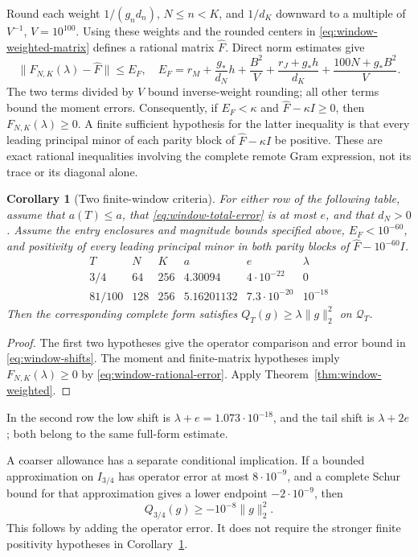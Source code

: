 \documentclass[11pt]{article}
\newtheorem{corollary}[theorem]{Corollary}
\theoremstyle{definition}
\theoremstyle{remark}
\numberwithin{equation}{section}
\begin{document}
Round each weight $1/(g_nd_n)$, $N\le n<K$, and $1/d_K$
downward to a multiple of $V^{-1}$, $V=10^{100}$.
Using these weights and the rounded centers in
\eqref{eq:window-weighted-matrix} defines a rational matrix
$\widehat F$.  Direct norm estimates give
\begin{equation}
 \|F_{N,K}(\lambda)-\widehat F\|\le E_F,
 \quad
 E_F=r_M+\frac{g_*}{d_N}h+\frac{B^2}{V}
       +\frac{r_J+g_*h}{d_K}
       +\frac{100N+g_*B^2}{V}.
 \label{eq:window-rational-error}
\end{equation}
The two terms divided by $V$ bound inverse-weight rounding;
all other terms bound the moment errors.  Consequently, if
$E_F<\kappa$ and $\widehat F-\kappa I\ge0$, then
$F_{N,K}(\lambda)\ge0$.  A finite sufficient hypothesis for
the latter inequality is that every leading principal minor of
each parity block of $\widehat F-\kappa I$ be positive.
These are exact rational inequalities involving the complete
remote Gram expression, not its trace or its diagonal alone.

\begin{corollary}[Two finite-window criteria]
\label{cor:window-conditional}
For either row of the following table, assume that
$a(T)\le a$, that \eqref{eq:window-total-error} is at most $e$,
and that $d_N>0$.  Assume the entry enclosures and magnitude bounds
specified above, $E_F<10^{-60}$, and positivity of every leading
principal minor in both parity blocks of
$\widehat F-10^{-60}I$.
\[
 \begin{array}{c|r|r|c|c|c}
 T&N&K&a&e&\lambda\\\hline
 3/4&64&256&4.30094&4\cdot10^{-22}&0\\
 81/100&128&256&5.16201132&7.3\cdot10^{-20}&10^{-18}
 \end{array}
\]
Then the corresponding complete form satisfies
$Q_T(g)\ge\lambda\|g\|_2^2$ on $\mathcal Q_T$.
\end{corollary}
\begin{proof}
The first two hypotheses give the operator comparison and error
bound in \eqref{eq:window-shifts}.  The moment and finite-matrix
hypotheses imply $F_{N,K}(\lambda)\ge0$ by
\eqref{eq:window-rational-error}.  Apply
Theorem~\ref{thm:window-weighted}.
\end{proof}

In the second row the low shift is
$\lambda+e=1.073\cdot10^{-18}$, and the tail shift is
$\lambda+2e$; both belong to the same full-form estimate.

A coarser allowance has a separate conditional implication.  If a
bounded approximation on $I_{3/4}$ has operator error at most
$8\cdot10^{-9}$, and a complete Schur bound for that approximation
gives a lower endpoint $-2\cdot10^{-9}$, then
\begin{equation}
 Q_{3/4}(g)\ge-10^{-8}\|g\|_2^2.
 \label{eq:window-coarse-allowance}
\end{equation}
This follows by adding the operator error.  It does not require
the stronger finite positivity hypotheses in
Corollary~\ref{cor:window-conditional}.
\end{document}
